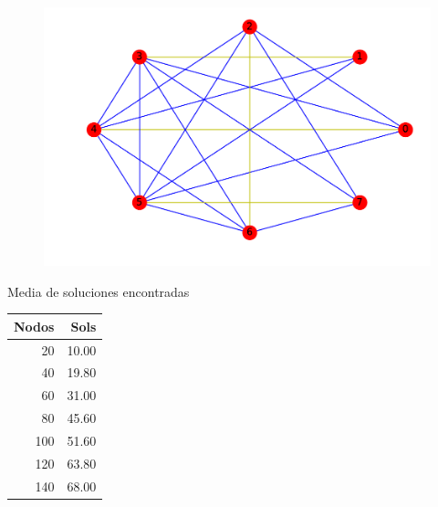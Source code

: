 \documentclass{beamer}
\begin{document}
\begin{frame}
\begin{figure}[h!]
\centering
\includegraphics[scale=0.5]{opt4}
\end{figure}
\end{frame}


\begin{frame}{Media de soluciones encontradas}
\begin{table}[ht]
\centering
\begin{tabular}{rr}
  \hline
  Nodos & Sols \\ 
  \hline
20 & 10.00 \\ 
40 & 19.80 \\ 
60 & 31.00 \\ 
80 & 45.60 \\ 
100 & 51.60 \\ 
120 & 63.80 \\ 
140 & 68.00 \\ 
   \hline
\end{tabular}
\end{table}
\end{frame}
\end{document}
